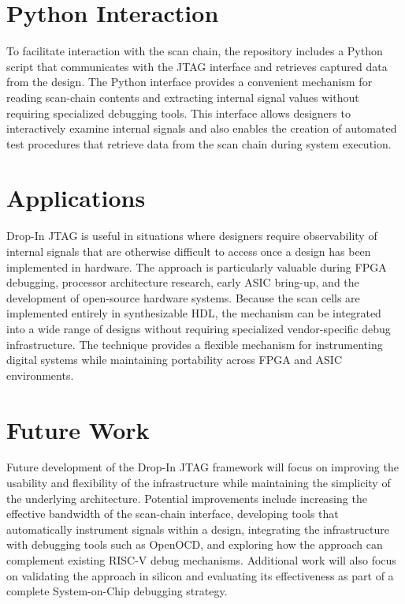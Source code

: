 \documentclass[10pt]{article}
\begin{document}
\section{Python Interaction}

To facilitate interaction with the scan chain, the repository includes a Python script that communicates with the JTAG interface and retrieves captured data from the design. The Python interface provides a convenient mechanism for reading scan-chain contents and extracting internal signal values without requiring specialized debugging tools. This interface allows designers to interactively examine internal signals and also enables the creation of automated test procedures that retrieve data from the scan chain during system execution.

\section{Applications}

Drop-In JTAG is useful in situations where designers require observability of internal signals that are otherwise difficult to access once a design has been implemented in hardware. The approach is particularly valuable during FPGA debugging, processor architecture research, early ASIC bring-up, and the development of open-source hardware systems. Because the scan cells are implemented entirely in synthesizable HDL, the mechanism can be integrated into a wide range of designs without requiring specialized vendor-specific debug infrastructure. The technique provides a flexible mechanism for instrumenting digital systems while maintaining portability across FPGA and ASIC environments.

\section{Future Work}

Future development of the Drop-In JTAG framework will focus on improving the usability and flexibility of the infrastructure while maintaining the simplicity of the underlying architecture. Potential improvements include increasing the effective bandwidth of the scan-chain interface, developing tools that automatically instrument signals within a design, integrating the infrastructure with debugging tools such as OpenOCD, and exploring how the approach can complement existing RISC-V debug mechanisms. Additional work will also focus on validating the approach in silicon and evaluating its effectiveness as part of a complete System-on-Chip debugging strategy.
\end{document}
